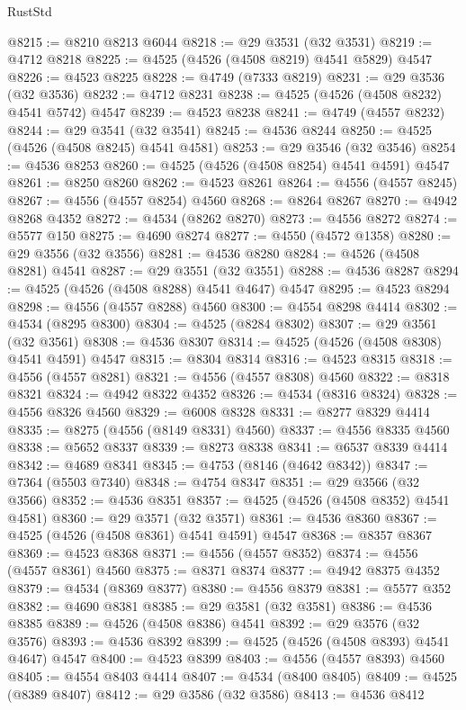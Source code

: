 \begin{lexlean}{RustStd}
\begin{coremodule}
{\begin{coremodule}
{{{{{{{{{{{{{{{{{{{{{{{{{{{{{{{{{{{{{{{{{{{{{{{{{{{{{{{@8215 := @8210 @8213 @6044
@8218 := @29 @3531 (@32 @3531)
@8219 := @4712 @8218
@8225 := @4525 (@4526 (@4508 @8219) @4541 @5829) @4547
@8226 := @4523 @8225
@8228 := @4749 (@7333 @8219)
@8231 := @29 @3536 (@32 @3536)
@8232 := @4712 @8231
@8238 := @4525 (@4526 (@4508 @8232) @4541 @5742) @4547
@8239 := @4523 @8238
@8241 := @4749 (@4557 @8232)
@8244 := @29 @3541 (@32 @3541)
@8245 := @4536 @8244
@8250 := @4525 (@4526 (@4508 @8245) @4541 @4581)
@8253 := @29 @3546 (@32 @3546)
@8254 := @4536 @8253
@8260 := @4525 (@4526 (@4508 @8254) @4541 @4591) @4547
@8261 := @8250 @8260
@8262 := @4523 @8261
@8264 := @4556 (@4557 @8245)
@8267 := @4556 (@4557 @8254) @4560
@8268 := @8264 @8267
@8270 := @4942 @8268 @4352
@8272 := @4534 (@8262 @8270)
@8273 := @4556 @8272
@8274 := @5577 @150
@8275 := @4690 @8274
@8277 := @4550 (@4572 @1358)
@8280 := @29 @3556 (@32 @3556)
@8281 := @4536 @8280
@8284 := @4526 (@4508 @8281) @4541
@8287 := @29 @3551 (@32 @3551)
@8288 := @4536 @8287
@8294 := @4525 (@4526 (@4508 @8288) @4541 @4647) @4547
@8295 := @4523 @8294
@8298 := @4556 (@4557 @8288) @4560
@8300 := @4554 @8298 @4414
@8302 := @4534 (@8295 @8300)
@8304 := @4525 (@8284 @8302)
@8307 := @29 @3561 (@32 @3561)
@8308 := @4536 @8307
@8314 := @4525 (@4526 (@4508 @8308) @4541 @4591) @4547
@8315 := @8304 @8314
@8316 := @4523 @8315
@8318 := @4556 (@4557 @8281)
@8321 := @4556 (@4557 @8308) @4560
@8322 := @8318 @8321
@8324 := @4942 @8322 @4352
@8326 := @4534 (@8316 @8324)
@8328 := @4556 @8326 @4560
@8329 := @6008 @8328
@8331 := @8277 @8329 @4414
@8335 := @8275 (@4556 (@8149 @8331) @4560)
@8337 := @4556 @8335 @4560
@8338 := @5652 @8337
@8339 := @8273 @8338
@8341 := @6537 @8339 @4414
@8342 := @4689 @8341
@8345 := @4753 (@8146 (@4642 @8342))
@8347 := @7364 (@5503 @7340)
@8348 := @4754 @8347
@8351 := @29 @3566 (@32 @3566)
@8352 := @4536 @8351
@8357 := @4525 (@4526 (@4508 @8352) @4541 @4581)
@8360 := @29 @3571 (@32 @3571)
@8361 := @4536 @8360
@8367 := @4525 (@4526 (@4508 @8361) @4541 @4591) @4547
@8368 := @8357 @8367
@8369 := @4523 @8368
@8371 := @4556 (@4557 @8352)
@8374 := @4556 (@4557 @8361) @4560
@8375 := @8371 @8374
@8377 := @4942 @8375 @4352
@8379 := @4534 (@8369 @8377)
@8380 := @4556 @8379
@8381 := @5577 @352
@8382 := @4690 @8381
@8385 := @29 @3581 (@32 @3581)
@8386 := @4536 @8385
@8389 := @4526 (@4508 @8386) @4541
@8392 := @29 @3576 (@32 @3576)
@8393 := @4536 @8392
@8399 := @4525 (@4526 (@4508 @8393) @4541 @4647) @4547
@8400 := @4523 @8399
@8403 := @4556 (@4557 @8393) @4560
@8405 := @4554 @8403 @4414
@8407 := @4534 (@8400 @8405)
@8409 := @4525 (@8389 @8407)
@8412 := @29 @3586 (@32 @3586)
@8413 := @4536 @8412
}}}}}}}}}}}}}}}}}}}}}}}}}}}}}}}}}}}}}}}}}}}}}}}}}}}}}}}
\end{coremodule}}
\end{coremodule}
\end{lexlean}
